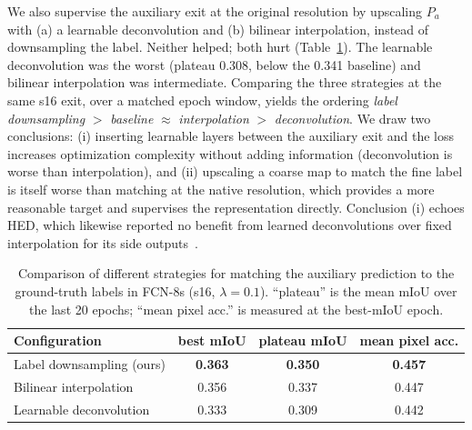 \documentclass[runningheads]{llncs}
\begin{document}
    We also supervise the auxiliary exit at the original resolution by upscaling $P_a$ with (a) a learnable deconvolution and (b) bilinear interpolation, instead of downsampling the label. Neither helped; both hurt (Table~\ref{tab:res}). The learnable deconvolution was the worst (plateau 0.308, below the 0.341 baseline) and bilinear interpolation was intermediate. Comparing the three strategies at the same s16 exit, over a matched epoch window, yields the ordering \emph{label downsampling} $>$ \emph{baseline} $\approx$ \emph{interpolation} $>$ \emph{deconvolution}. We draw two conclusions: (i) inserting learnable layers between the auxiliary exit and the loss increases optimization complexity without adding information (deconvolution is worse than interpolation), and (ii) upscaling a coarse map to match the fine label is itself worse than matching at the native resolution, which provides a more reasonable target and supervises the representation directly. Conclusion (i) echoes HED, which likewise reported no benefit from learned deconvolutions over fixed interpolation for its side outputs~\cite{ref_hed}.
    

    \begin{table}[h]
    \centering
    \caption{Comparison of different strategies for matching the auxiliary prediction to the ground-truth labels in FCN-8s (s16, $\lambda=0.1$). ``plateau'' is the mean mIoU over the last 20 epochs; ``mean pixel acc.'' is measured at the best-mIoU epoch.}
    \label{tab:res}
    \begin{tabular}{lccc}
    \toprule
    Configuration & best mIoU & plateau mIoU & mean pixel acc. \\
    \midrule
    Label downsampling (ours) & \textbf{0.363} & \textbf{0.350} & \textbf{0.457} \\
    Bilinear interpolation & 0.356 & 0.337 & 0.447 \\
    Learnable deconvolution & 0.333 & 0.309 & 0.442 \\
    \bottomrule
    \end{tabular}
    \end{table}
    
\end{document}
